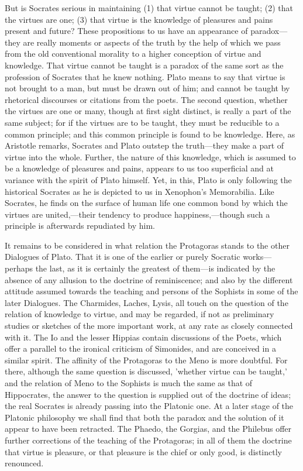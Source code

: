 \documentclass[11pt,letter]{article}
\begin{document}
\par  But is Socrates serious in maintaining (1) that virtue cannot be taught; (2) that the virtues are one; (3) that virtue is the knowledge of pleasures and pains present and future? These propositions to us have an appearance of paradox—they are really moments or aspects of the truth by the help of which we pass from the old conventional morality to a higher conception of virtue and knowledge. That virtue cannot be taught is a paradox of the same sort as the profession of Socrates that he knew nothing. Plato means to say that virtue is not brought to a man, but must be drawn out of him; and cannot be taught by rhetorical discourses or citations from the poets. The second question, whether the virtues are one or many, though at first sight distinct, is really a part of the same subject; for if the virtues are to be taught, they must be reducible to a common principle; and this common principle is found to be knowledge. Here, as Aristotle remarks, Socrates and Plato outstep the truth—they make a part of virtue into the whole. Further, the nature of this knowledge, which is assumed to be a knowledge of pleasures and pains, appears to us too superficial and at variance with the spirit of Plato himself. Yet, in this, Plato is only following the historical Socrates as he is depicted to us in Xenophon's Memorabilia. Like Socrates, he finds on the surface of human life one common bond by which the virtues are united,—their tendency to produce happiness,—though such a principle is afterwards repudiated by him.

\par  It remains to be considered in what relation the Protagoras stands to the other Dialogues of Plato. That it is one of the earlier or purely Socratic works—perhaps the last, as it is certainly the greatest of them—is indicated by the absence of any allusion to the doctrine of reminiscence; and also by the different attitude assumed towards the teaching and persons of the Sophists in some of the later Dialogues. The Charmides, Laches, Lysis, all touch on the question of the relation of knowledge to virtue, and may be regarded, if not as preliminary studies or sketches of the more important work, at any rate as closely connected with it. The Io and the lesser Hippias contain discussions of the Poets, which offer a parallel to the ironical criticism of Simonides, and are conceived in a similar spirit. The affinity of the Protagoras to the Meno is more doubtful. For there, although the same question is discussed, 'whether virtue can be taught,' and the relation of Meno to the Sophists is much the same as that of Hippocrates, the answer to the question is supplied out of the doctrine of ideas; the real Socrates is already passing into the Platonic one. At a later stage of the Platonic philosophy we shall find that both the paradox and the solution of it appear to have been retracted. The Phaedo, the Gorgias, and the Philebus offer further corrections of the teaching of the Protagoras; in all of them the doctrine that virtue is pleasure, or that pleasure is the chief or only good, is distinctly renounced.
\end{document}

